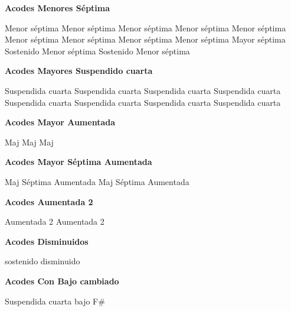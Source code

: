 \textbf{Acodes Menores S\'eptima}
\vskip 25pt

\small
{} Menor s\'eptima
 Menor s\'eptima
 Menor s\'eptima
\vskip 25pt
 Menor s\'eptima
 Menor s\'eptima
 Menor s\'eptima
\vskip 25pt
 Menor s\'eptima
 Menor s\'eptima
 Menor s\'eptima
\vskip 25pt
 Mayor s\'eptima
 Sostenido Menor s\'eptima
 Sostenido Menor s\'eptima
\normalsize

\vskip 20pt

\textbf{Acodes Mayores Suspendido cuarta}
\vskip 25pt

\small
{} Suspendida cuarta
 Suspendida cuarta
 Suspendida cuarta
\vskip 25pt
 Suspendida cuarta
 Suspendida cuarta
 Suspendida cuarta
\vskip 25pt
 Suspendida cuarta
 Suspendida cuarta
\normalsize

\vskip 20pt
\textbf{Acodes Mayor Aumentada}
\vskip 25pt

\small
{} Maj  \qquad\qquad
{} Maj
 Maj
\normalsize

\vskip 20pt
\textbf{Acodes Mayor S\'eptima Aumentada}
\vskip 25pt

\small
{} Maj S\'eptima Aumentada
 Maj S\'eptima Aumentada
\normalsize

\vskip 20pt
\textbf{Acodes Aumentada 2}
\vskip 25pt

\small
{} Aumentada 2
 Aumentada 2
\normalsize


\vskip 20pt
\textbf{Acodes Disminuidos}
\vskip 25pt

\small
{} sostenido disminuido
\normalsize


\vskip 20pt
\textbf{Acodes Con Bajo cambiado}
\vskip 25pt

\small
{}
\vskip 20pt
\vskip 20pt
\vskip 20pt
\vskip 25pt
 Suspendida cuarta bajo F\#
\normalsize

